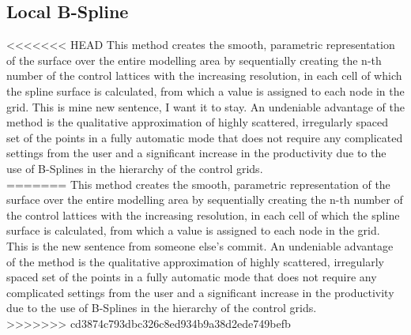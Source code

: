 \subsection{Local B-Spline}
\label{local_b_spline}

<<<<<<< HEAD
This method creates the smooth, parametric representation of the surface over the entire modelling area by sequentially creating the n-th number of the control lattices with the increasing resolution, in each cell of which the spline surface is calculated, from which a value is assigned to each node in the grid. This is mine new sentence, I want it to stay. An undeniable advantage of the method is the qualitative approximation of highly scattered, irregularly spaced set of the points in a fully automatic mode that does not require any complicated settings from the user and a significant increase in the productivity due to the use of B-Splines in the hierarchy of the control grids.\\
=======
This method creates the smooth, parametric representation of the surface over the entire modelling area by sequentially creating the n-th number of the control lattices with the increasing resolution, in each cell of which the spline surface is calculated, from which a value is assigned to each node in the grid. This is the new sentence from someone else's commit. An undeniable advantage of the method is the qualitative approximation of highly scattered, irregularly spaced set of the points in a fully automatic mode that does not require any complicated settings from the user and a significant increase in the productivity due to the use of B-Splines in the hierarchy of the control grids.\\
>>>>>>> cd3874c793dbc326c8ed934b9a38d2ede749befb

